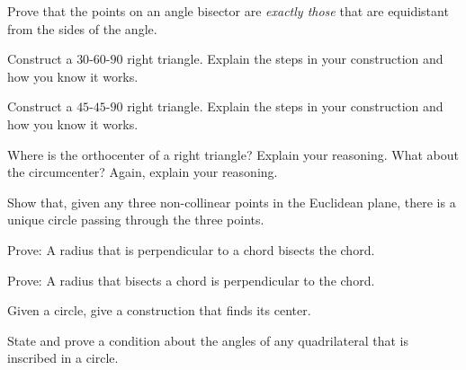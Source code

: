 
\begin{prob}
Prove that the points on an angle bisector are \emph{exactly those} that are equidistant from the sides of the angle. 
\end{prob}

\begin{prob}
Construct a $30$-$60$-$90$ right triangle. Explain the steps in your
  construction and how you know it works.
\end{prob}

\begin{prob}
Construct a $45$-$45$-$90$ right triangle. Explain the steps in your
  construction and how you know it works.
\end{prob}

\begin{prob}
Where is the orthocenter of a right triangle?  Explain your reasoning.  What about the circumcenter?  Again, explain your reasoning. 
\end{prob}

\begin{prob}
Show that, given any three non-collinear points in the Euclidean plane, there is a unique circle passing through the three points.
\end{prob}

\begin{prob}
Prove: A radius that is perpendicular to a chord bisects the chord. 
\end{prob}

\begin{prob}
Prove:  A radius that bisects a chord is perpendicular to the chord. 
\end{prob}

\begin{prob}
Given a circle, give a construction that finds its center.
\end{prob}

\begin{prob}
State and prove a condition about the angles of any quadrilateral that is inscribed in a circle.  
\end{prob}

